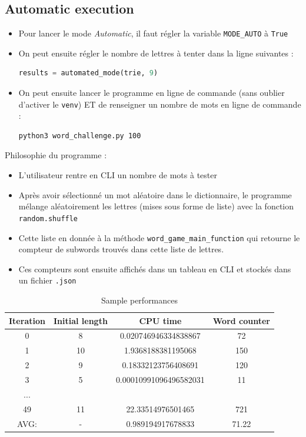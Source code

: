 \documentclass[10pt,a4paper,hidelinks]{article}
\begin{document}
\subsection{Automatic execution}
\begin{itemize}
    \item Pour lancer le mode \textit{Automatic}, il faut régler la variable \verb|MODE_AUTO| à \verb|True|
    \item On peut ensuite régler le nombre de lettres à tenter dans la ligne suivantes :
    \begin{lstlisting}[language=Python]
    results = automated_mode(trie, 9)
    \end{lstlisting}

    \item On peut ensuite lancer le programme en ligne de commande (sans oublier d'activer le \verb|venv|) ET de renseigner un nombre de mots en ligne de commande :
    \begin{lstlisting}[language=Bash]
    python3 word_challenge.py 100
    \end{lstlisting}
\end{itemize}
Philosophie du programme :
\begin{itemize}
    \item L'utilisateur rentre en CLI un nombre de mots à tester
    \item Après avoir sélectionné un mot aléatoire dans le dictionnaire, le programme mélange aléatoirement les lettres (mises sous forme de liste) avec la fonction \verb|random.shuffle|
    \item Cette liste en donnée à la méthode \verb|word_game_main_function| qui retourne le compteur de subwords trouvés dans cette liste de lettres.
    \item Ces compteurs sont ensuite affichés dans un tableau en CLI et stockés dans un fichier \verb|.json|
\end{itemize}

\begin{table}[!ht]
    \centering
    \begin{tabular}{|c|c|c|c|}
        \hline
        Iteration & Initial length & CPU time & Word counter \\ \hline
        0 & 8 & 0.020746946334838867 & 72 \\ 
        1 & 10 & 1.9368188381195068 & 150 \\
        2 & 9 & 0.18332123756408691 & 120 \\ 
        3 & 5 & 0.00010991096496582031 & 11 \\ 
        ... & ~ & ~ & ~ \\ 
        49 & 11 & 22.33514976501465 & 721 \\ 
        \hline
        \hline
        AVG: & - & 0.989194917678833 & 71.22 \\ 
        \hline
    \end{tabular}
    \caption{Sample performances}
\end{table}
\end{document}
